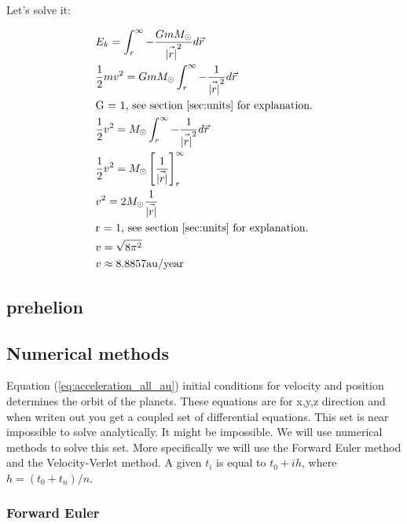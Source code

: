 Let's solve it: 

\begin{align*}
	&E_k =\int_r^\infty -\frac{GmM_\odot}{\vec{|r|}^2} d\vec{r}
	\\
	&\frac{1}{2}mv^2 = GmM_\odot \int_r^\infty -\frac{1}{\vec{|r|}^2} d\vec{r}
	\\
	&\text{G = 1, see section \ref{sec:units} for explanation.}
	\\
	&\frac{1}{2}v^2 = M_\odot \int_r^\infty -\frac{1}{\vec{|r|}^2} d\vec{r}
	\\
	&\frac{1}{2}v^2 = M_\odot \left[ \frac{1}{\vec{|r|}} \right]_r^\infty
	\\
	&v^2 = 2M_\odot \frac{1}{\vec{|r|}}
	\\
	&\text{r = 1, see section \ref{sec:units} for explanation.}
	\\
	&v = \sqrt{8\pi^2}
	\\
	&v \approx 8.8857 \rm{au/year}
\end{align*}




\subsection{prehelion}\label{sec:perihelion}


















\subsection{Numerical methods}

Equation (\ref{eq:acceleration_all_au}) initial conditions for velocity and position determines the orbit of the planets. 
These equations are for x,y,z direction and when writen out you get a coupled set of differential equations. This set is near impossible to solve analytically. It might be impossible. We will use numerical methods to solve this set. More specifically we will use the Forward Euler method and the Velocity-Verlet method. A given $t_i$ is equal to $t_0 + ih$, where $h = (t_{0} + t_{n})/n $.

\subsubsection{Forward Euler}

